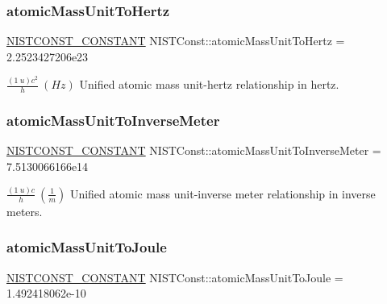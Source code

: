 \subsubsection{\texorpdfstring{atomic\+Mass\+Unit\+To\+Hertz}{atomicMassUnitToHertz}}
{\footnotesize\ttfamily \mbox{\hyperlink{group___n_i_s_t_const-_macros_ga2b0fc1d7452373f816175dd86ce26729}{N\+I\+S\+T\+C\+O\+N\+S\+T\+\_\+\+C\+O\+N\+S\+T\+A\+NT}} N\+I\+S\+T\+Const\+::atomic\+Mass\+Unit\+To\+Hertz = 2.\+2523427206e23}

$\frac{(1\ u)c^2}{h} \ (Hz)$ Unified atomic mass unit-\/hertz relationship in hertz. \mbox{\label{group___n_i_s_t_const-_atomic_mass_unit_gaa66e75563e7a7c28bc3c4b5c4ab482a1}} 
\subsubsection{\texorpdfstring{atomic\+Mass\+Unit\+To\+Inverse\+Meter}{atomicMassUnitToInverseMeter}}
{\footnotesize\ttfamily \mbox{\hyperlink{group___n_i_s_t_const-_macros_ga2b0fc1d7452373f816175dd86ce26729}{N\+I\+S\+T\+C\+O\+N\+S\+T\+\_\+\+C\+O\+N\+S\+T\+A\+NT}} N\+I\+S\+T\+Const\+::atomic\+Mass\+Unit\+To\+Inverse\+Meter = 7.\+5130066166e14}

$\frac{(1\ u)c}{h} \ (\frac{1}{m})$ Unified atomic mass unit-\/inverse meter relationship in inverse meters. \mbox{\label{group___n_i_s_t_const-_atomic_mass_unit_ga8c1405e0299d1388f1452bf4e04778f9}} 
\subsubsection{\texorpdfstring{atomic\+Mass\+Unit\+To\+Joule}{atomicMassUnitToJoule}}
{\footnotesize\ttfamily \mbox{\hyperlink{group___n_i_s_t_const-_macros_ga2b0fc1d7452373f816175dd86ce26729}{N\+I\+S\+T\+C\+O\+N\+S\+T\+\_\+\+C\+O\+N\+S\+T\+A\+NT}} N\+I\+S\+T\+Const\+::atomic\+Mass\+Unit\+To\+Joule = 1.\+492418062e-\/10}

